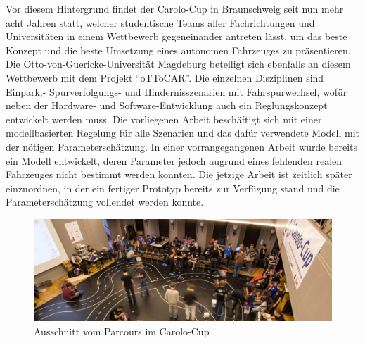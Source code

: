 Vor diesem Hintergrund findet der Carolo-Cup in Braunschweig seit nun mehr acht Jahren statt, welcher studentische Teams aller Fachrichtungen und Universitäten in einem Wettbewerb gegeneinander antreten lässt, um das beste Konzept und die beste Umsetzung eines autonomen Fahrzeuges zu präsentieren. Die Otto-von-Guericke-Universität Magdeburg beteiligt sich ebenfalls an diesem Wettbewerb mit dem Projekt "`oTToCAR"'. Die einzelnen Disziplinen sind Einpark,- Spurverfolgungs- und Hindernisszenarien mit Fahrspurwechsel, wofür neben der Hardware- und Software-Entwicklung auch ein Reglungskonzept entwickelt werden muss. Die vorliegenen Arbeit beschäftigt sich mit einer modellbasierten Regelung für alle Szenarien und das dafür verwendete Modell mit der nötigen Parameterschätzung. In einer vorrangegangenen Arbeit \cite{VikAnd} wurde bereits ein Modell entwickelt, deren Parameter jedoch augrund eines fehlenden realen Fahrzeuges nicht bestimmt werden konnten. Die jetzige Arbeit ist zeitlich später einzuordnen, in der ein fertiger Prototyp bereits zur Verfügung stand und die Parameterschätzung vollendet werden konnte. 
\vspace{1cm}
\begin{figure}[H]
\centering
\includegraphics[scale=0.45]{Bilder/Carolo.png}
\caption{Ausschnitt vom Parcours im Carolo-Cup \cite{FotoCaro}}
\end{figure}